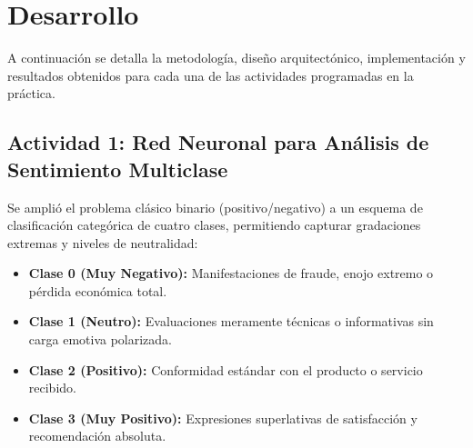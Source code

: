 \documentclass[12pt]{article}
\begin{document}
\newpage
\section{Desarrollo}

A continuación se detalla la metodología, diseño arquitectónico, implementación y resultados obtenidos para cada una de las actividades programadas en la práctica.

\subsection{Actividad 1: Red Neuronal para Análisis de Sentimiento Multiclase}

Se amplió el problema clásico binario (positivo/negativo) a un esquema de clasificación categórica de cuatro clases, permitiendo capturar gradaciones extremas y niveles de neutralidad:
\begin{itemize}
	\item \textbf{Clase 0 (Muy Negativo):} Manifestaciones de fraude, enojo extremo o pérdida económica total.
	\item \textbf{Clase 1 (Neutro):} Evaluaciones meramente técnicas o informativas sin carga emotiva polarizada.
	\item \textbf{Clase 2 (Positivo):} Conformidad estándar con el producto o servicio recibido.
	\item \textbf{Clase 3 (Muy Positivo):} Expresiones superlativas de satisfacción y recomendación absoluta.
\end{itemize}
\end{document}
